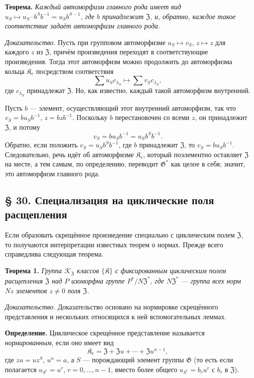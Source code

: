 \documentclass[11pt]{article}
\begin{document}
\noindent\textbf{Теорема.} \emph{Каждый автоморфизм главного рода имеет вид \(u_S\mapsto u_S\cdot b^Sb^{-1}=u_Sb^{S-1}\), где \(b\) принадлежит \(\mathfrak Z\), и, обратно, каждое такое соответствие задаёт автоморфизм главного рода.}

\noindent\emph{Доказательство.} Пусть при групповом автоморфизме \(u_S\mapsto v_S\), \(z\mapsto z\) для каждого \(z\) из \(\mathfrak Z\), причём произведения переходят в соответствующие произведения. Тогда этот автоморфизм можно продолжить до автоморфизма кольца \(\mathfrak K_r\) посредством соответствия
\[
\sum u_Sc_{\lambda_S}\mapsto\sum v_Sc_{\lambda_S},
\]
где \(c_{\lambda_S}\) принадлежат \(\mathfrak Z\). Но, как известно, каждый такой автоморфизм внутренний.

Пусть \(b\) --- элемент, осуществляющий этот внутренний автоморфизм, так что \(v_S=bu_Sb^{-1}\), \(z=bzb^{-1}\). Поскольку \(b\) перестановочен со всеми \(z\), он принадлежит \(\mathfrak Z\), и потому
\[
v_S=bu_Sb^{-1}=u_Sb^Sb^{-1}.
\]
Обратно, если положить \(v_S=u_Sb^Sb^{-1}\), где \(b\) принадлежит \(\mathfrak Z\), то \(v_S=bu_Sb^{-1}\). Следовательно, речь идёт об автоморфизме \(\mathfrak K_r\), который поэлементно оставляет \(\mathfrak Z\) на месте, а тем самым, по определению, переводит \(\mathfrak G^*\) как целое в себя; значит, это автоморфизм главного рода.

\subsection*{§ 30. Специализация на циклические поля расщепления}\label{spezialisierung-auf-zyklische-zerfaellungskoerper}

Если образовать скрещённое произведение специально с циклическим полем \(\mathfrak Z\), то получаются интерпретации известных теорем о нормах. Прежде всего справедлива следующая теорема.

\noindent\textbf{Теорема 1.} \emph{Группа \(\mathscr K_{\mathfrak Z}\) классов \(\{\mathfrak K\}\) с фиксированным циклическим полем расщепления \(\mathfrak Z\) над \(P\) изоморфна группе \(P^*/N\mathfrak Z^*\), где \(N\mathfrak Z^*\) --- группа всех норм \(Nz\) элементов \(z\neq0\) поля \(\mathfrak Z\).}

\noindent\emph{Доказательство.} Доказательство основано на нормировке скрещённого представления и нескольких относящихся к ней вспомогательных леммах.

\noindent\textbf{Определение.} Циклическое скрещённое представление называется \emph{нормированным}, если оно имеет вид
\[
\mathfrak K_r=\mathfrak Z+\mathfrak Zu+\cdots+\mathfrak Zu^{n-1},
\]
где \(zu=uz^S\), \(u^n=a\), а \(S\) --- порождающий элемент группы \(\mathfrak G\) (то есть если полагается \(u_{S^r}=u^r\), \(r=0,\ldots,n-1\), вместо более общего \(u_{S^r}=b_ru^r\) с \(b_r\) в \(\mathfrak Z\)).
\end{document}
